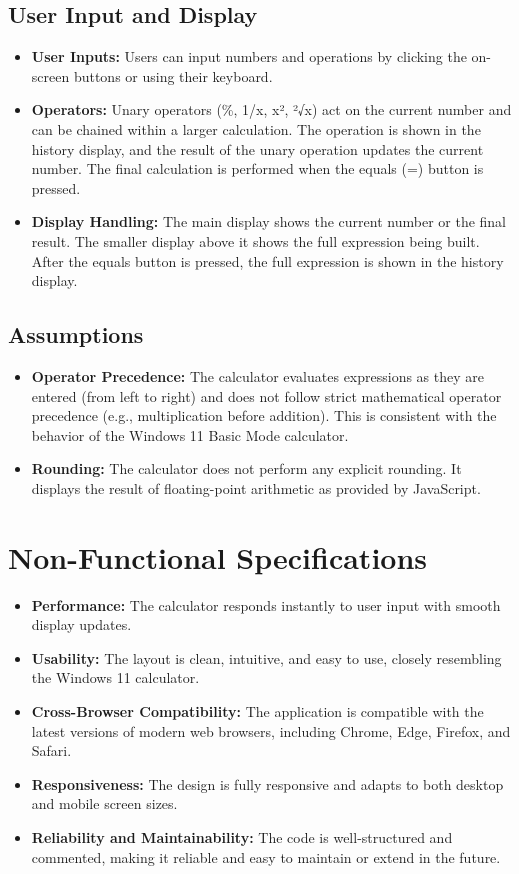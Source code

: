 \documentclass{article}
\begin{document}
\subsection{User Input and Display}
\begin{itemize}
    \item \textbf{User Inputs:} Users can input numbers and operations by clicking the on-screen buttons or using their keyboard.
    \item \textbf{Operators:} Unary operators (\%, 1/x, x², ²√x) act on the current number and can be chained within a larger calculation. The operation is shown in the history display, and the result of the unary operation updates the current number. The final calculation is performed when the equals (=) button is pressed.
    \item \textbf{Display Handling:} The main display shows the current number or the final result. The smaller display above it shows the full expression being built. After the equals button is pressed, the full expression is shown in the history display.
\end{itemize}

\subsection{Assumptions}
\begin{itemize}
    \item \textbf{Operator Precedence:} The calculator evaluates expressions as they are entered (from left to right) and does not follow strict mathematical operator precedence (e.g., multiplication before addition). This is consistent with the behavior of the Windows 11 Basic Mode calculator.
    \item \textbf{Rounding:} The calculator does not perform any explicit rounding. It displays the result of floating-point arithmetic as provided by JavaScript.
\end{itemize}

\section{Non-Functional Specifications}
\begin{itemize}
    \item \textbf{Performance:} The calculator responds instantly to user input with smooth display updates.
    \item \textbf{Usability:} The layout is clean, intuitive, and easy to use, closely resembling the Windows 11 calculator.
    \item \textbf{Cross-Browser Compatibility:} The application is compatible with the latest versions of modern web browsers, including Chrome, Edge, Firefox, and Safari.
    \item \textbf{Responsiveness:} The design is fully responsive and adapts to both desktop and mobile screen sizes.
    \item \textbf{Reliability and Maintainability:} The code is well-structured and commented, making it reliable and easy to maintain or extend in the future.
\end{itemize}
\end{document}
